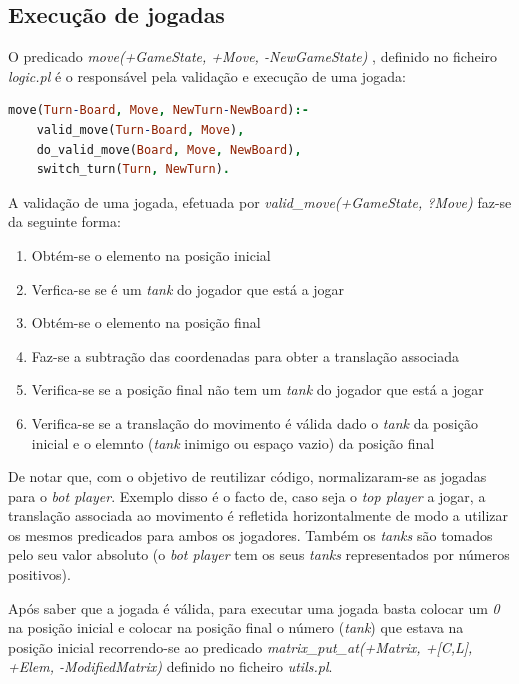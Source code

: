 \documentclass[a4paper,11pt,portuguese]{article}
\begin{document}
    \subsection{Execução de jogadas}

    O predicado \textit{move(+GameState, +Move, -NewGameState)} , definido no ficheiro
    \textit{logic.pl} é o responsável pela validação e execução de uma jogada:

\begin{lstlisting}[language=prolog]
% move(+GameState, +Move, -NewGameState)
move(Turn-Board, Move, NewTurn-NewBoard):-
    valid_move(Turn-Board, Move),
    do_valid_move(Board, Move, NewBoard),
    switch_turn(Turn, NewTurn).
\end{lstlisting}

    \noindent A validação de uma jogada, efetuada por
    \textit{valid\_move(+GameState, ?Move) } faz-se da seguinte forma:

    \begin{enumerate}[topsep=4pt,itemsep=2pt]
        \item Obtém-se o elemento na posição inicial
        \item Verfica-se se é um \textit{tank} do jogador que está a jogar
        \item Obtém-se o elemento na posição final
        \item Faz-se a subtração das coordenadas para obter a translação associada
        \item Verifica-se se a posição final não tem um \textit{tank} do jogador que
        está a jogar
        \item Verifica-se se a translação do movimento é válida dado o \textit{tank}
        da posição inicial e o elemnto (\textit{tank} inimigo ou espaço vazio) da posição final
    \end{enumerate}

    \noindent De notar que, com o objetivo de reutilizar código, normalizaram-se as jogadas
    para o \textit{bot player}. Exemplo disso é o facto de, caso seja o \textit{top player}
    a jogar, a translação associada ao movimento é refletida horizontalmente de modo a utilizar
    os mesmos predicados para ambos os jogadores. Também os \textit{tanks} são tomados pelo seu
    valor absoluto (o \textit{bot player} tem os seus \textit{tanks} representados por números
    positivos).

    Após saber que a jogada é válida, para executar uma jogada basta colocar um \textit{0}
    na posição inicial e colocar na posição final o número (\textit{tank}) que estava na
    posição inicial recorrendo-se ao predicado
    \textit{matrix\_put\_at(+Matrix, +[C,L], +Elem, -ModifiedMatrix) } definido no ficheiro
    \textit{utils.pl}.
\end{document}

